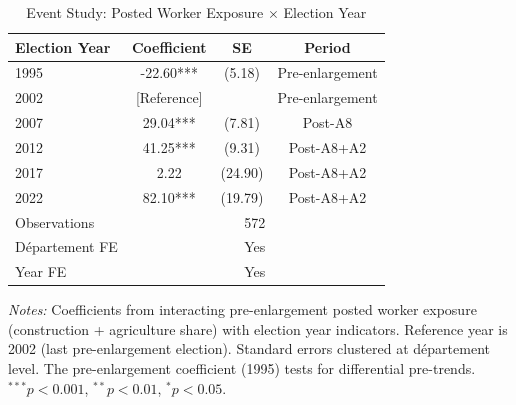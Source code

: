 \begin{table}[htbp]
\centering
\caption{Event Study: Posted Worker Exposure $\times$ Election Year}
\label{tab:event}
\begin{tabular}{lccc}
\toprule
Election Year & Coefficient & SE & Period \\
\midrule
1995 & -22.60*** & (5.18) & Pre-enlargement \\
2002 & [Reference] & & Pre-enlargement \\
2007 & 29.04*** & (7.81) & Post-A8 \\
2012 & 41.25*** & (9.31) & Post-A8+A2 \\
2017 & 2.22 & (24.90) & Post-A8+A2 \\
2022 & 82.10*** & (19.79) & Post-A8+A2 \\
\midrule
Observations & \multicolumn{3}{c}{572} \\
D\'epartement FE & \multicolumn{3}{c}{Yes} \\
Year FE & \multicolumn{3}{c}{Yes} \\
\bottomrule
\end{tabular}
\begin{tablenotes}[flushleft]\small
\item \textit{Notes:} Coefficients from interacting pre-enlargement posted worker exposure (construction + agriculture share) with election year indicators. Reference year is 2002 (last pre-enlargement election). Standard errors clustered at d\'epartement level. The pre-enlargement coefficient (1995) tests for differential pre-trends. $^{***}p<0.001$, $^{**}p<0.01$, $^{*}p<0.05$.
\end{tablenotes}
\end{table}
